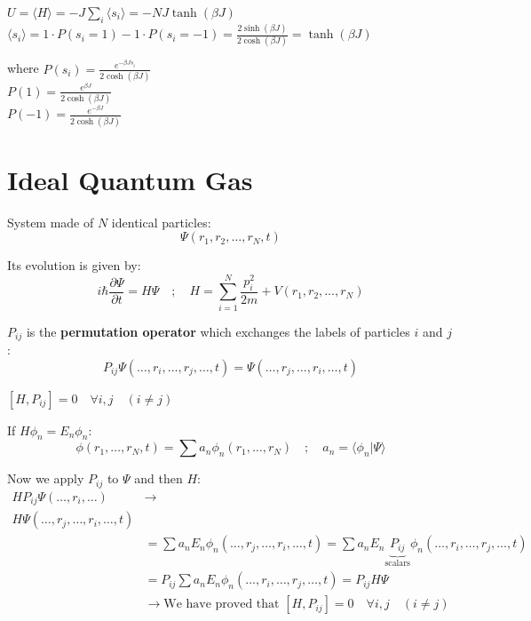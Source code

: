 \documentclass[12pt,a4paper]{report}
\newcommand{\esp}{\vspace{0.5cm}}
\begin{document}
	$U = \langle H \rangle = -J \sum_i \langle s_i \rangle = -NJ \tanh(\beta J)$ \\
	$\langle s_i \rangle = 1 \cdot P(s_i=1) - 1 \cdot P(s_i=-1) = \frac{2\sinh(\beta J)}{2\cosh(\beta J)} = \tanh(\beta J)$
	
	\esp
	
	where $P(s_i) = \frac{e^{-\beta J s_i}}{2\cosh(\beta J)}$ \\
	$P(1) = \frac{e^{\beta J}}{2\cosh(\beta J)}$ \\
	$P(-1) = \frac{e^{-\beta J}}{2\cosh(\beta J)}$
	
	\section{Ideal Quantum Gas}
	
	System made of $N$ identical particles:
	\begin{equation}
		\Psi(r_1, r_2, \dots, r_N, t)
	\end{equation}
	
	\esp
	
	Its evolution is given by:
	\begin{equation}
		i\hbar \frac{\partial \Psi}{\partial t} = H\Psi \quad ; \quad H = \sum_{i=1}^N \frac{p_i^2}{2m} + V(r_1, r_2, \dots, r_N)
	\end{equation}
	
	\esp
	
	$P_{ij}$ is the \textbf{permutation operator} which exchanges the labels of particles $i$ and $j$:
	\begin{equation}
		P_{ij} \Psi(\dots, r_i, \dots, r_j, \dots, t) = \Psi(\dots, r_j, \dots, r_i, \dots, t)
	\end{equation}
	
	\esp
	
	$[H, P_{ij}] = 0 \quad \forall i, j \quad (i \neq j)$
	
	\esp
	
	If $H\phi_n = E_n\phi_n$:
	\begin{equation}
		\phi(r_1, \dots, r_N, t) = \sum a_n \phi_n(r_1, \dots, r_N) \quad ; \quad a_n = \langle \phi_n | \Psi \rangle
	\end{equation}
	
	\esp
	
	Now we apply $P_{ij}$ to $\Psi$ and then $H$:
	\begin{align*}
		H P_{ij} \Psi(\dots, r_i, \dots) &\to \\
		H \Psi(\dots, r_j, \dots, r_i, \dots, t)\\ 
		&= \sum a_n E_n \phi_n(\dots, r_j, \dots, r_i, \dots, t) = \sum a_n E_n \underbrace{P_{ij}}_{\text{scalars}} \phi_n(\dots, r_i, \dots, r_j, \dots, t) \\
		&= P_{ij} \sum a_n E_n \phi_n(\dots, r_i, \dots, r_j, \dots, t) = P_{ij} H \Psi \\
		&\to \text{We have proved that } [H, P_{ij}] = 0 \quad \forall i, j \quad (i \neq j)
	\end{align*}
	
\end{document}
